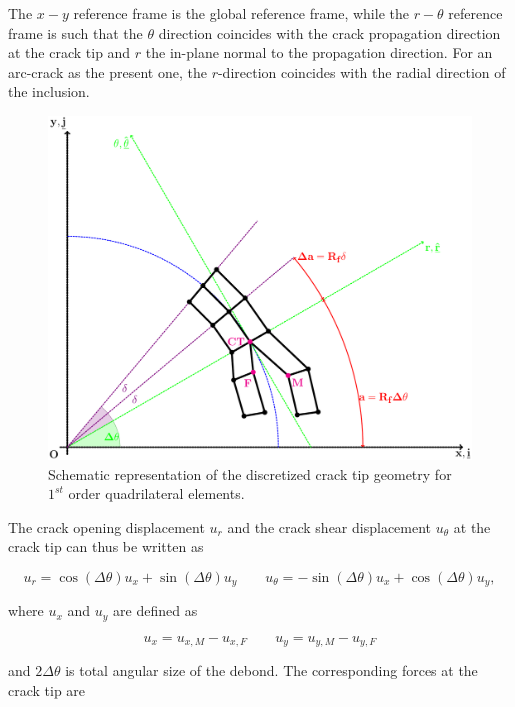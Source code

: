 The $x-y$ reference frame is the global reference frame, while the $r-\theta$ reference frame is such that the $\theta$ direction coincides with the crack propagation direction at the crack tip and $r$ the in-plane normal to the propagation direction. For an arc-crack as the present one, the $r$-direction coincides with the radial direction of the inclusion.

\begin{figure}[!h]
\includegraphics[width=\textwidth]{VCCT-linear-appendix.pdf}
\caption{Schematic representation of the discretized crack tip geometry for  $1^{st}$ order quadrilateral elements.}\label{paperA:fig:vcctlinearapp}
\end{figure}

The crack opening displacement $u_{r}$ and the crack shear displacement $u_{\theta}$ at the crack tip can thus be written as

\begin{equation}
u_{r}=\cos\left(\Delta\theta\right) u_{x}+\sin\left(\Delta\theta\right) u_{y}\qquad u_{\theta}=-\sin\left(\Delta\theta\right) u_{x}+\cos\left(\Delta\theta\right) u_{y},
\end{equation}

where $u_{x}$ and $u_{y}$ are defined as

\begin{equation}\label{paperA:eq:uxuy}
u_{x}=u_{x,M}-u_{x,F}\qquad u_{y}=u_{y,M}-u_{y,F}
\end{equation}

and $2\Delta\theta$ is total angular size of the debond. The corresponding forces at the crack tip are

